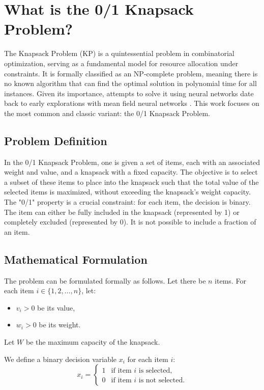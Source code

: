 \section{What is the 0/1 Knapsack Problem?}

The Knapsack Problem (KP) is a quintessential problem in combinatorial optimization, serving as a fundamental model for resource allocation under constraints.
It is formally classified as an NP-complete problem, meaning there is no known algorithm that can find the optimal solution in polynomial time for all instances.
Given its importance, attempts to solve it using neural networks date back to early explorations with mean field neural networks \cite{ohlssonNeuralNetworksOptimization1993}. This work focuses on the most common and classic variant: the 0/1 Knapsack Problem.

\subsection{Problem Definition}

In the 0/1 Knapsack Problem, one is given a set of items, each with an associated weight and value, and a knapsack with a fixed capacity.
The objective is to select a subset of these items to place into the knapsack such that the total value of the selected items is maximized, without exceeding the knapsack's weight capacity.
The "0/1" property is a crucial constraint: for each item, the decision is binary.
The item can either be fully included in the knapsack (represented by 1) or completely excluded (represented by 0).
It is not possible to include a fraction of an item.

\subsection{Mathematical Formulation}

The problem can be formulated formally as follows. Let there be \(n\) items. For each item \(i \in \{1, 2, \dots, n\}\), let:
\begin{itemize}
    \item \(v_i > 0\) be its value,
    \item \(w_i > 0\) be its weight.
\end{itemize}
Let \(W\) be the maximum capacity of the knapsack.

We define a binary decision variable \(x_i\) for each item \(i\):
\[
x_i = 
\begin{cases} 
1 & \text{if item } i \text{ is selected,} \\
0 & \text{if item } i \text{ is not selected.} 
\end{cases}
\]

